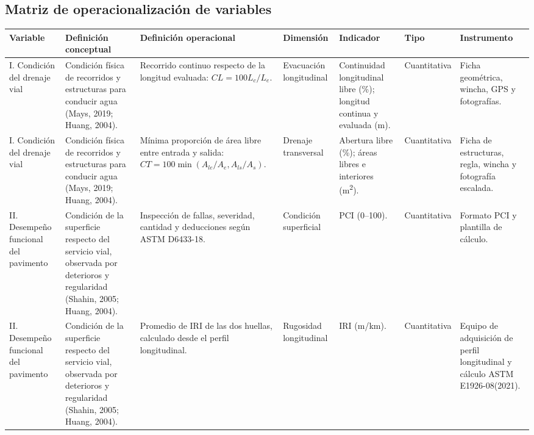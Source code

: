 \begin{matrizOperacionalizacion}
\subsection{Matriz de operacionalización de variables}
\vspace{4pt}
\noindent\begin{tabularx}{\linewidth}{|
>{\raggedright\arraybackslash}p{2.45cm}|
>{\raggedright\arraybackslash}p{3.45cm}|
>{\raggedright\arraybackslash}p{4.2cm}|
>{\raggedright\arraybackslash}p{2.35cm}|
>{\raggedright\arraybackslash}X|
>{\raggedright\arraybackslash}p{1.8cm}|
>{\raggedright\arraybackslash}p{3.65cm}|}
\hline
\textbf{Variable} & \textbf{Definición conceptual} & \textbf{Definición operacional} & \textbf{Dimensión} & \textbf{Indicador} & \textbf{Tipo} & \textbf{Instrumento} \\ \hline
I. Condición del drenaje vial &
Condición física de recorridos y estructuras para conducir agua (Mays, 2019; Huang, 2004). &
Recorrido continuo respecto de la longitud evaluada: \(CL=100L_c/L_e\). &
Evacuación longitudinal &
Continuidad longitudinal libre (\%); longitud continua y evaluada (m). &
Cuantitativa &
Ficha geométrica, wincha, GPS y fotografías. \\ \hline
I. Condición del drenaje vial &
Condición física de recorridos y estructuras para conducir agua (Mays, 2019; Huang, 2004). &
Mínima proporción de área libre entre entrada y salida: \(CT=100\min(A_{le}/A_e,A_{ls}/A_s)\). &
Drenaje transversal &
Abertura libre (\%); áreas libres e interiores (m\textsuperscript{2}). &
Cuantitativa &
Ficha de estructuras, regla, wincha y fotografía escalada. \\ \hline
II. Desempeño funcional del pavimento &
Condición de la superficie respecto del servicio vial, observada por deterioros y regularidad (Shahin, 2005; Huang, 2004). &
Inspección de fallas, severidad, cantidad y deducciones según ASTM D6433-18. &
Condición superficial &
PCI (0–100). &
Cuantitativa &
Formato PCI y plantilla de cálculo. \\ \hline
II. Desempeño funcional del pavimento &
Condición de la superficie respecto del servicio vial, observada por deterioros y regularidad (Shahin, 2005; Huang, 2004). &
Promedio de IRI de las dos huellas, calculado desde el perfil longitudinal. &
Rugosidad longitudinal &
IRI (m/km). &
Cuantitativa &
Equipo de adquisición de perfil longitudinal y cálculo ASTM E1926-08(2021). \\ \hline
\end{tabularx}
\end{matrizOperacionalizacion}

